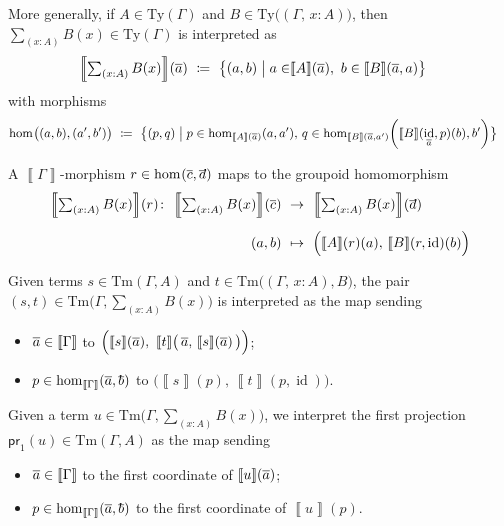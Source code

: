 \documentclass{article}
\theoremstyle{definition}
\renewcommand{\int}[1]{\mathopen{}\left\llbracket #1
    \right\rrbracket\mathclose{}}       %
\newcommand{\Sig}[2]{\textstyle\sum_{#1} #2}              %
\newcommand{\tproj}{\mathsf{pr}}
\newcommand{\Ty}{\mathrm{Ty}}
\newcommand{\Tm}{\mathrm{Tm}}
\renewcommand{\hom}[3][]{\mathrm{hom}_{#1}\mathopen{}\left( #2, #3 \right)\mathclose{}}
\DeclareMathOperator{\id}{id}				    %
\newcommand{\defeq}{
	\mathrel{\mathrel{\mathop:}\mkern-1.2mu=}}	%
\newcommand{\tup}[1]{\overline{\smash{#1}\vphantom{a}}}
\newcommand{\n}{%
}                %
\begin{document}

More generally, if $A \in \Ty(\Gamma)$ and $B \in \Ty \big( (\Gamma,\, x:A) \big)$, then $\Sig{(x:A)}{B(x)}\in \Ty(\Gamma)$ is interpreted as
\begin{align*}
    \int{\Sig{(x:A)}{B(x)}}(\tup{a})\ \defeq\ \big\{ (a,b) \mathrel{\big|} a \in &\int{A}\n(\tup{a}),\ b \in \int{B}\n(\tup{a},a) \big\}
\end{align*}
with morphisms
\begin{align*}
    \hom%
    {\big.(a,b)}{(a',b')}\ \defeq\ \big\{ (p,q)& \mathrel{\big|} p \in \hom[\int{A}(\tup{a})]{a}{a'},\, q \in \hom[\int{B}(\tup{a},a')]{\big.\int{B}(\id_{\tup{a}},p)(b)}{b'} \big\}
\end{align*}

A $\int{\Gamma}$-morphism $r \in \hom%
{\tup{c}}{\tup{d}}$ maps to the groupoid homomorphism
\begin{align*}
    \int{\Sig{(x:A)}{B(x)}}(r)\colon\ \int{\Sig{(x:A)}{B(x)}}(\tup{c})\ &\to\ \int{\Sig{(x:A)}{B(x)}}(\tup{d}) \\[2mm]
    (a,b)\ &\mapsto\ \Big( \int{A}(r)(a),\, \int{B}(r,\id%
    )(b) \Big)
\end{align*}

Given terms $s \in \Tm(\Gamma, A)$ and $t \in \Tm \big( (\Gamma,\, x:A), B \big)$, the pair $(s,t) \in \Tm\Big( \Gamma, \Sig{(x:A)}{B(x)} \Big)$ is interpreted as the map sending
\begin{itemize}
    \item $\tup{a} \in \int{\Gamma}$ to $\Big( \int{s}\n(\tup{a}),\ \int{t}\n\big(\, \tup{a},\,\int{s}\n(\tup{a}) \,\big) \Big)$;
    
    \item $p \in \hom[\int{\Gamma}]{\tup{a}}{\tup{b}}$ to $\Big( \int{s}(p),\, \int{t}(p,\id) \Big)$.
\end{itemize}

Given a term $u \in \Tm\Big( \Gamma, \Sig{(x:A)}{B(x)} \Big)$, we interpret the first projection $\tproj_1(u) \in \Tm(\Gamma, A)$ as the map sending
\begin{itemize}
    \item $\tup{a} \in \int{\Gamma}$ to the first coordinate of $\int{u}(\tup{a})$;
    
    \item $p \in \hom[\int{\Gamma}]{\tup{a}}{\tup{b}}$ to the first coordinate of $\int{u}(p)$.
\end{itemize}
\end{document}
